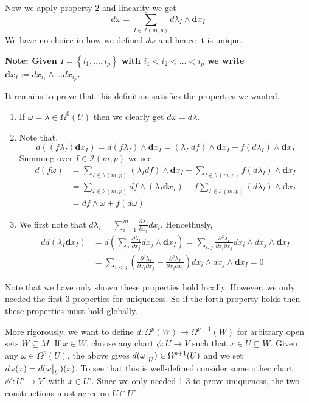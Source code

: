 \documentclass[11pt]{article}
\newcommand{\defeq}{:=}
\newcommand\restr[2]{{%
  \left.\kern-\nulldelimiterspace %
  #1 %
  \vphantom{\big|} %
  \right|_{#2} %
  }}
\newcommand*{\pd}[3][]{\ensuremath{\frac{\partial^{#1} {#2}}{\partial {#3}^{#1}}}}
\newcommand{\mv}[1]{\textbf{#1}}
\newenvironment{note}
	{\begin{mdframed}[backgroundcolor=white, linecolor=RubineRed, roundcorner=5pt, linewidth=1pt]\bfseries{Note:}\normalfont
	\setlength{\parindent}{0pt}}
	{\end{mdframed}}
\begin{document}
Now we apply property 2 and linearity we get
\[
	d\omega = \sum_{I\in\mathcal{I}(m, p)}d\lambda_I \wedge \mv{d}x_I
\]
We have no choice in how we defined $d\omega$ and hence it is unique.

\begin{note}
Given $I=\left\{ i_1, \dots, i_p\right\}$ with $i_1 < i_2 < \dots < i_p$ we write $\mv{d}x_I\defeq dx_{i_1} \wedge \dots dx_{i_p}$.
\end{note}

It remains to prove that this definition satisfies the properties we wanted.

\begin{enumerate}
	\item If $\omega = \lambda\in\Omega^0(U)$ then we clearly get $d\omega = d\lambda$.
	\item Note that, 
		\[
 d((f\lambda_I)\mv{d}x_I)=d(f\lambda_I) \wedge \mv{d}x_I = (\lambda_I\; df) \wedge \mv{d}x_I + f(d\lambda_I) \wedge \mv{d}x_I
		\]
		Summing over $I\in\mathcal{I}(m, p)$ we see
		\begin{align*}
			d(f\omega) &= \sum_{I\in\mathcal{I}(m, p)}(\lambda_I df) \wedge \mv{d}x_I + \sum_{I\in\mathcal{I}(m, p)}f(d\lambda_I)\wedge \mv{d}x_I\\
					   & = \sum_{I\in\mathcal{I}(m, p)}df \wedge (\lambda_I\mv{d}x_I) + f\sum_{I\in\mathcal{I}(m, p)}(d\lambda_I)\wedge \mv{d}x_I\\ 
					   & = df \wedge \omega + f (d\omega)
		\end{align*}
	\item We first note that $d\lambda_I=\sum_{i=1}^m \pd{\lambda_I}{x_i}dx_i$.
		Hencethusly,
		\begin{align*}
			dd(\lambda_I\mv{d}x_I)&=d\left( \sum_{j}\pd{\lambda_I}{x_j}dx_j \wedge \mv{d}x_I\right) =  \sum_{i, j}\pd{^2 \lambda_I}{x_i\partial x_j}dx_i \wedge dx_j \wedge \mv{d}x_I \\
								  &=\sum_{i < j}\left( \pd{^2\lambda_I}{x_i\partial x_j}- \pd{^2\lambda_I}{x_j \partial x_i} \right)dx_i \wedge dx_j \wedge \mv{d}x_I = 0
		\end{align*}
\end{enumerate}

Note that we have only shown these properties hold locally.
However, we only needed the first 3 properties for uniqueness.
So if the forth property holds then these properties must hold globally.

More rigorously, we want to define $d:\Omega^p(W)\to \Omega^{p+1}(W)$ for arbitrary open sets $W\subseteq M$.
If $x\in W$, choose any chart $\phi: U \to V$ such that $x\in U\subseteq W$.
Given any $\omega\in\Omega^p(U)$, the above gives $d(\restr{\omega}{U})\in \Omega^{p+1}(U)$ and we set $d\omega(x) = d(\restr{\omega}{U})(x)$.
To see that this is well-defined consider some other chart $\phi':U' \to V'$ with $x\in U'$.
Since we only needed 1-3 to prove uniqueness, the two constructions must agree on $U \cap U'$.
\end{document}
